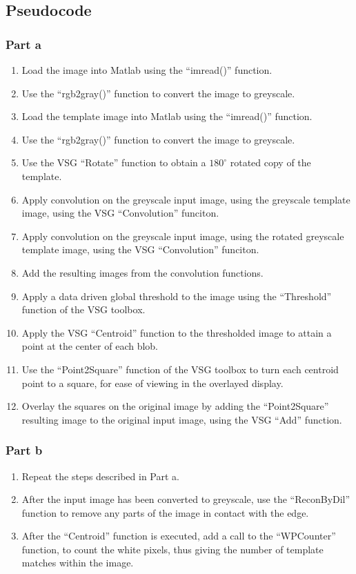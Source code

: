 \documentclass[a4paper]{article}
\begin{document}
	\subsection{Pseudocode}
	\subsubsection{Part a}
	\begin{enumerate}
		\item Load the image into Matlab using the ``imread()''
			function.
		\item Use the ``rgb2gray()'' function to convert the image to
			greyscale.
		\item Load the template image into Matlab using the ``imread()''
			function.
		\item Use the ``rgb2gray()'' function to convert the image to
			greyscale.
		\item Use the VSG ``Rotate'' function to obtain a $180^\circ$ rotated
			copy of the template.
		\item Apply convolution on the greyscale input image, using the
			greyscale template image, using the VSG ``Convolution''
			funciton.
		\item Apply convolution on the greyscale input image, using the
			rotated greyscale template image, using the VSG
			``Convolution'' funciton.
		\item Add the resulting images from the convolution functions.
		\item Apply a data driven global threshold to the image using
			the ``Threshold'' function of the VSG toolbox.
		\item Apply the VSG ``Centroid'' function to the thresholded
			image to attain a point at the center of each blob.
		\item Use the ``Point2Square'' function of the VSG toolbox to
			turn each centroid point to a square, for ease of
			viewing in the overlayed display.
		\item Overlay the squares on the original image by adding the
			``Point2Square'' resulting image to the original input
			image, using the VSG ``Add'' function.
	\end{enumerate}
	\subsubsection{Part b}
	\begin{enumerate}
		\item Repeat the steps described in Part a.
		\item After the input image has been converted to greyscale, use
			the ``ReconByDil'' function to remove any parts of the image
			in contact with the edge.
		\item After the ``Centroid'' function is executed, add a call to
			the ``WPCounter'' function, to count the white pixels,
			thus giving the number of template matches within the
			image.
	\end{enumerate}
\end{document}
